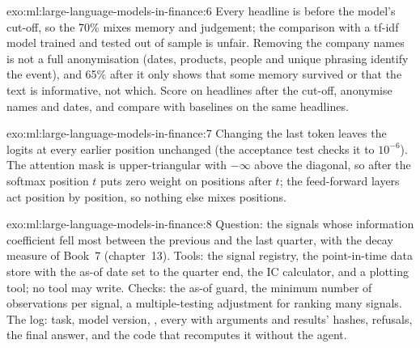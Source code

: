 \begin{solution}{exo:ml:large-language-models-in-finance:6}
Every headline is before the model's cut-off, so the 70\% mixes memory and judgement; the comparison with a tf-idf model
trained and tested out of sample is unfair. Removing the company names is not a full anonymisation (dates, products, people
and unique phrasing identify the event), and 65\% after it only shows that some memory survived or that the text is
informative, not which. Score on headlines after the cut-off, anonymise names and dates, and compare with baselines on the
same headlines.
\end{solution}

\begin{solution}{exo:ml:large-language-models-in-finance:7}
Changing the last token leaves the logits at every earlier position unchanged (the acceptance test checks it to $10^{-6}$).
The attention mask is upper-triangular with $-\infty$ above the diagonal, so after the softmax position $t$ puts zero weight
on positions after $t$; the feed-forward layers act position by position, so nothing else mixes positions.
\end{solution}

\begin{solution}{exo:ml:large-language-models-in-finance:8}
Question: the signals whose information coefficient fell most between the previous and the last quarter, with the
decay measure of Book~7 (chapter~13). Tools: the signal registry, the point-in-time data store with the as-of date set to the
quarter end, the IC calculator, and a plotting tool; no tool may write. Checks: the as-of guard, the minimum number of
observations per signal, a multiple-testing adjustment for ranking many signals. The log: task, model version, ,
every  with arguments and results' hashes, refusals, the final answer, and the code that recomputes it without the
agent.
\end{solution}

